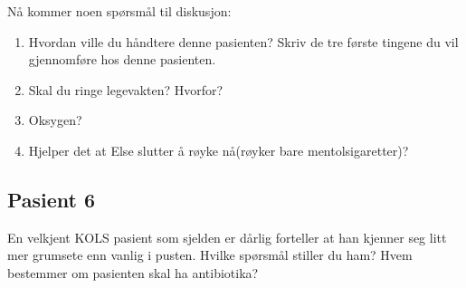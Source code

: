 				Nå kommer noen spørsmål til diskusjon:
					\begin{enumerate}
						\item Hvordan ville du håndtere denne pasienten? Skriv de tre første tingene du vil gjennomføre hos denne pasienten.\\
						\item Skal du ringe legevakten? Hvorfor?\\
						\item Oksygen?\\
						\item Hjelper det at Else slutter å røyke nå(røyker bare mentolsigaretter)?\\
					\end{enumerate}
			\subsection{Pasient 6}
				En velkjent KOLS pasient som sjelden er dårlig forteller at han kjenner seg litt mer grumsete enn vanlig i pusten. Hvilke spørsmål stiller du ham? Hvem bestemmer om pasienten skal ha antibiotika?